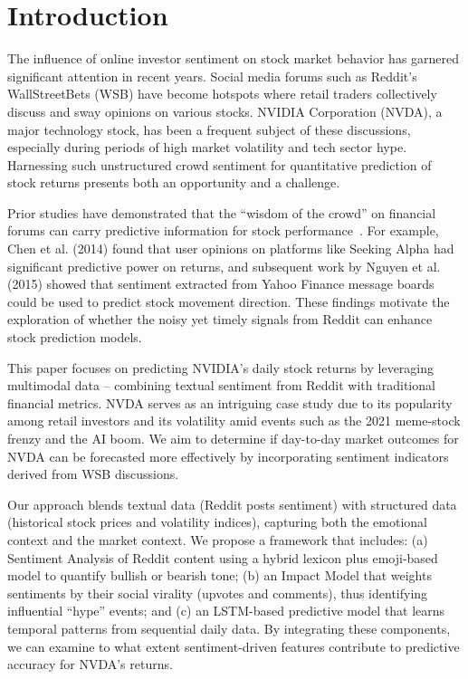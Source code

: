 \documentclass[conference]{IEEEtran}
\begin{document}
\section{Introduction}
The influence of online investor sentiment on stock market behavior has garnered significant attention in recent years. Social media forums such as Reddit’s WallStreetBets (WSB) have become hotspots where retail traders collectively discuss and sway opinions on various stocks. NVIDIA Corporation (NVDA), a major technology stock, has been a frequent subject of these discussions, especially during periods of high market volatility and tech sector hype. Harnessing such unstructured crowd sentiment for quantitative prediction of stock returns presents both an opportunity and a challenge.

Prior studies have demonstrated that the “wisdom of the crowd” on financial forums can carry predictive information for stock performance~\cite{chen2014wisdom,nguyen2015sentiment}. For example, Chen et al. (2014) found that user opinions on platforms like Seeking Alpha had significant predictive power on returns, and subsequent work by Nguyen et al. (2015) showed that sentiment extracted from Yahoo Finance message boards could be used to predict stock movement direction. These findings motivate the exploration of whether the noisy yet timely signals from Reddit can enhance stock prediction models.

This paper focuses on predicting NVIDIA’s daily stock returns by leveraging multimodal data – combining textual sentiment from Reddit with traditional financial metrics. NVDA serves as an intriguing case study due to its popularity among retail investors and its volatility amid events such as the 2021 meme-stock frenzy and the AI boom. We aim to determine if day-to-day market outcomes for NVDA can be forecasted more effectively by incorporating sentiment indicators derived from WSB discussions.

Our approach blends textual data (Reddit posts sentiment) with structured data (historical stock prices and volatility indices), capturing both the emotional context and the market context. We propose a framework that includes: (a) Sentiment Analysis of Reddit content using a hybrid lexicon plus emoji-based model to quantify bullish or bearish tone; (b) an Impact Model that weights sentiments by their social virality (upvotes and comments), thus identifying influential “hype” events; and (c) an LSTM-based predictive model that learns temporal patterns from sequential daily data. By integrating these components, we can examine to what extent sentiment-driven features contribute to predictive accuracy for NVDA’s returns.
\end{document}
